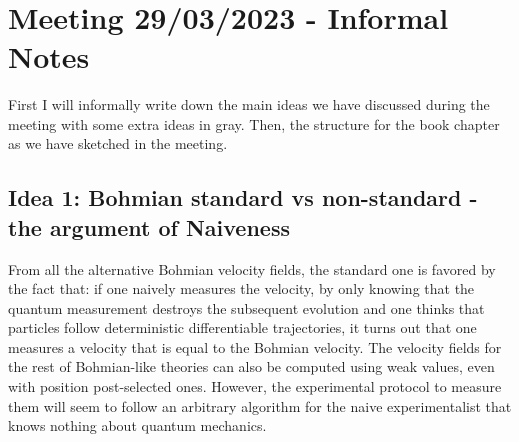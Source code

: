 \documentclass[11pt, a4paper]{article} %
\title{\vspace{-1.5cm} {\bf }}
\date{\vspace{-11ex}}
\begin{document}
\section*{Meeting 29/03/2023 - Informal Notes}
First I will informally write down the main ideas we have discussed during the meeting with some extra ideas in gray. Then, the structure for the book chapter as we have sketched in the meeting.

\subsection*{Idea 1: Bohmian standard vs non-standard - the argument of Naiveness}
From all the alternative Bohmian velocity fields, the standard one is favored by the fact that: if one naively measures the velocity, by only knowing that the quantum measurement destroys the subsequent evolution and one thinks that particles follow deterministic differentiable trajectories, it turns out that one measures a velocity that is equal to the Bohmian velocity. The velocity fields for the rest of Bohmian-like theories can also be computed using weak values, even with position post-selected ones. However, the experimental protocol to measure them will seem to follow an arbitrary algorithm for the naive experimentalist that knows nothing about quantum mechanics.
\end{document}
